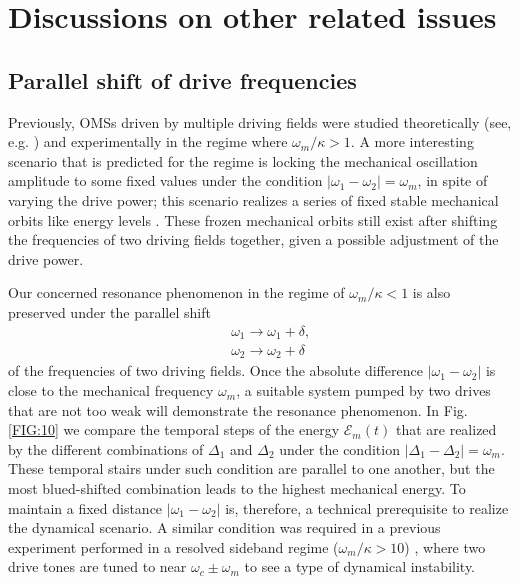 \documentclass[a4paper,fleqn]{cas-dc}
\begin{document}
 \section{Discussions on other related issues}
 
\subsection{Parallel shift of drive frequencies}
Previously, OMSs driven by multiple driving fields were studied theoretically (see, e.g. \cite{mari2009gently}) and experimentally \cite{shomroni2019two} in the regime where $\omega_m/\kappa>1$. A more interesting scenario that is predicted for the regime is locking the mechanical oscillation amplitude to some fixed values under the condition $|\omega_1-\omega_2|=\omega_m$, in spite of varying the drive power; this scenario realizes a series of fixed stable 
mechanical orbits like energy levels
\cite{he2020mechanical,wu2022amplitude,li2022ultra,yan2023force}. These frozen mechanical orbits still exist after shifting the frequencies of two driving fields together, given a possible adjustment of the drive power. 

Our concerned resonance phenomenon in the regime of 
$\omega_m/\kappa<1$ is also preserved under the parallel shift 
\begin{eqnarray}
&&\omega_1\rightarrow \omega_1+\delta,\nonumber\\
&&\omega_2\rightarrow \omega_2+\delta
\label{shift}
\end{eqnarray}
of the frequencies of two driving fields.
Once the absolute difference $|\omega_1-\omega_2|$ is close to the mechanical frequency $\omega_m$, a suitable system pumped by two drives that are not too weak will demonstrate the resonance phenomenon. In Fig. \ref{FIG:10} we compare the temporal steps of the energy $\mathcal{E}_m(t)$ that are realized by the different combinations of $\Delta_1$ and $\Delta_2$ under the condition $|\Delta_1-\Delta_2|=\omega_m$. These temporal stairs under such condition are parallel to one another, but the most blued-shifted combination leads to the highest mechanical energy. To maintain a fixed distance $|\omega_1-\omega_2|$ is, therefore, a technical prerequisite to realize the dynamical scenario. A similar condition was required in a previous experiment performed in a resolved sideband regime ($\omega_m/\kappa>10$) \cite{shomroni2019two}, where two drive tones are tuned to near $\omega_c\pm\omega_m$ to see a type of dynamical instability.   
\end{document}
